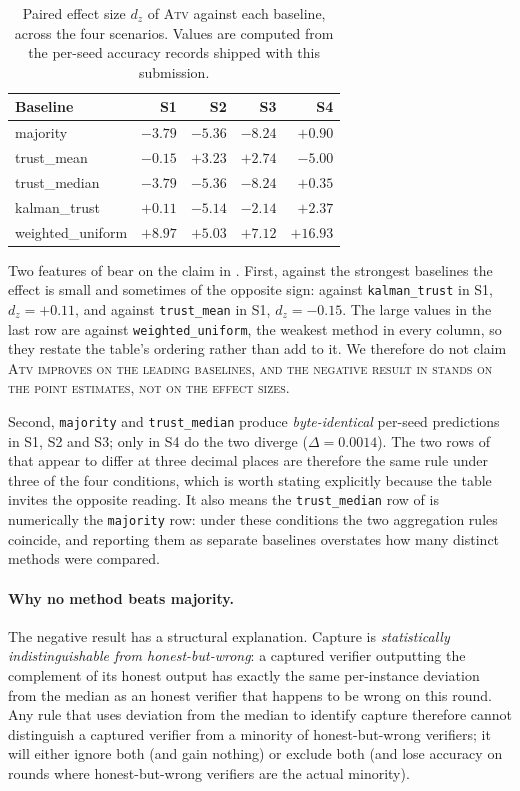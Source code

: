 \documentclass[11pt]{article}
\begin{document}
\begin{table}[ht]
\caption{Paired effect size $d_z$ of \textsc{Atv} against each baseline,
across the four scenarios. Values are computed from the per-seed accuracy
records shipped with this submission.}
\label{tab:dz}
\centering
\small
\begin{tabular}{lrrrr}
\toprule
Baseline & S1 & S2 & S3 & S4 \\
\midrule
majority         & $-3.79$ & $-5.36$ & $-8.24$ & $+0.90$ \\
trust\_mean      & $-0.15$ & $+3.23$ & $+2.74$ & $-5.00$ \\
trust\_median    & $-3.79$ & $-5.36$ & $-8.24$ & $+0.35$ \\
kalman\_trust    & $+0.11$ & $-5.14$ & $-2.14$ & $+2.37$ \\
weighted\_uniform & $+8.97$ & $+5.03$ & $+7.12$ & $+16.93$ \\
\bottomrule
\end{tabular}
\end{table}

Two features of  bear on the claim in . First,
against the strongest baselines the effect is small and sometimes of the
opposite sign: against \texttt{kalman\_trust} in S1, $d_z = +0.11$, and against
\texttt{trust\_mean} in S1, $d_z = -0.15$. The large values in the last row are
against \texttt{weighted\_uniform}, the weakest method in every column, so they
restate the table's ordering rather than add to it. We therefore do not claim
\scshape{Atv} improves on the leading baselines, and the negative result in
 stands on the point estimates, not on the effect sizes.

Second, \texttt{majority} and \texttt{trust\_median} produce
\emph{byte-identical} per-seed predictions in S1, S2 and S3; only in S4 do the
two diverge ($\Delta = 0.0014$). The two rows of  that appear to
differ at three decimal places are therefore the same rule under three of the
four conditions, which is worth stating explicitly because the table invites
the opposite reading. It also means the \texttt{trust\_median} row of
 is numerically the \texttt{majority} row: under these conditions
the two aggregation rules coincide, and reporting them as separate baselines
overstates how many distinct methods were compared.

\paragraph{Why no method beats majority.}
The negative result has a structural explanation. Capture is
\emph{statistically indistinguishable from honest-but-wrong}: a
captured verifier outputting the complement of its honest output has
exactly the same per-instance deviation from the median as an honest
verifier that happens to be wrong on this round. Any rule that uses
deviation from the median to identify capture therefore cannot
distinguish a captured verifier from a minority of honest-but-wrong
verifiers; it will either ignore both (and gain nothing) or exclude
both (and lose accuracy on rounds where honest-but-wrong verifiers
are the actual minority).
\end{document}
